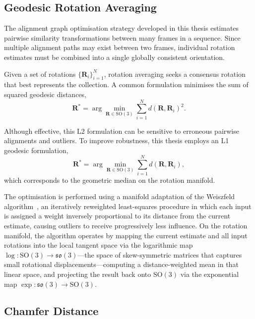\subsection{Geodesic Rotation Averaging}

The alignment graph optimisation strategy developed in this thesis estimates pairwise similarity transformations between many frames in a sequence. Since multiple alignment paths may exist between two frames, individual rotation estimates must be combined into a single globally consistent orientation.

Given a set of rotations $\{\mathbf{R}_i\}_{i=1}^{N}$, rotation averaging seeks a consensus rotation that best represents the collection. A common formulation minimises the sum of squared geodesic distances,
\begin{equation}
\mathbf{R}^{*} = \arg\min_{\mathbf{R}\in\mathrm{SO}(3)} \sum_{i=1}^{N} d(\mathbf{R},\mathbf{R}_i)^2.
\end{equation}

Although effective, this L2 formulation can be sensitive to erroneous pairwise alignments and outliers. To improve robustness, this thesis employs an L1 geodesic formulation,
\begin{equation}
\mathbf{R}^{*} = \arg\min_{\mathbf{R}\in\mathrm{SO}(3)} \sum_{i=1}^{N} d(\mathbf{R},\mathbf{R}_i),
\end{equation}
which corresponds to the geometric median on the rotation manifold.

The optimisation is performed using a manifold adaptation of the Weiszfeld algorithm~\cite{weiszfeld1937point}, an iteratively reweighted least-squares procedure in which each input is assigned a weight inversely proportional to its distance from the current estimate, causing outliers to receive progressively less influence. On the rotation manifold, the algorithm operates by mapping the current estimate and all input rotations into the local tangent space via the logarithmic map $\log: \mathrm{SO}(3) \to \mathfrak{so}(3)$---the space of skew-symmetric matrices that captures small rotational displacements---computing a distance-weighted mean in that linear space, and projecting the result back onto $\mathrm{SO}(3)$ via the exponential map $\exp: \mathfrak{so}(3) \to \mathrm{SO}(3)$.

\subsection{Chamfer Distance}
\label{sec:chamfer_distance}

